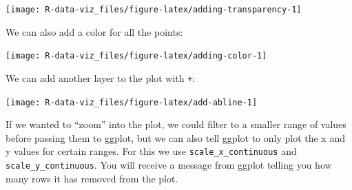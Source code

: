 \documentclass[]{book}
\newenvironment{Shaded}{\begin{snugshade}}{\end{snugshade}}
\newcommand{\KeywordTok}[1]{\textcolor[rgb]{0.13,0.29,0.53}{\textbf{#1}}}
\newcommand{\DataTypeTok}[1]{\textcolor[rgb]{0.13,0.29,0.53}{#1}}
\newcommand{\DecValTok}[1]{\textcolor[rgb]{0.00,0.00,0.81}{#1}}
\newcommand{\FloatTok}[1]{\textcolor[rgb]{0.00,0.00,0.81}{#1}}
\newcommand{\StringTok}[1]{\textcolor[rgb]{0.31,0.60,0.02}{#1}}
\newcommand{\OperatorTok}[1]{\textcolor[rgb]{0.81,0.36,0.00}{\textbf{#1}}}
\newcommand{\NormalTok}[1]{#1}
\theoremstyle{definition}
\theoremstyle{definition}
\theoremstyle{definition}
\theoremstyle{remark}
\begin{document}
\texttt{[image: R-data-viz\_files/figure-latex/adding-transparency-1]}

We can also add a color for all the points:

\begin{Shaded}
\end{Shaded}

\texttt{[image: R-data-viz\_files/figure-latex/adding-color-1]}

We can add another layer to the plot with \texttt{+}:

\begin{Shaded}
\end{Shaded}

\texttt{[image: R-data-viz\_files/figure-latex/add-abline-1]}

If we wanted to ``zoom'' into the plot, we could filter to a smaller
range of values before passing them to ggplot, but we can also tell
ggplot to only plot the x and y values for certain ranges. For this we
use \texttt{scale\_x\_continuous} and \texttt{scale\_y\_continuous}. You
will receive a message from ggplot telling you how many rows it has
removed from the plot.
\end{document}
